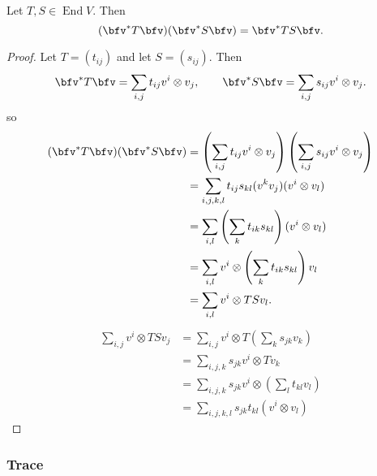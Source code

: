 \documentclass{article}
\DeclareMathOperator{\End}{End}
\begin{document}
\begin{proposition}
    Let $T, S \in \End V$.
    Then
    \[
        (\bfv^\ast T \bfv)(\bfv^\ast S \bfv)
        =
        \bfv^\ast TS \bfv.
    \]
\end{proposition}

\begin{proof}
    Let $T = (t_{ij})$ and let $S = (s_{ij})$.
    Then
    \[
        \bfv^\ast T \bfv
        =
        \sum_{i,j}
        t_{ij}
        v^i \otimes v_j
        ,\qquad
        \bfv^\ast S \bfv
        =
        \sum_{i,j}
        s_{ij}
        v^i \otimes v_j.
    \]
    so
    \begin{align*}
        (\bfv^\ast T \bfv)
        (\bfv^\ast S \bfv)
        &=
        \left(
            \sum_{i,j}
            t_{ij}
            v^i \otimes v_j
        \right)
        \left(
            \sum_{i,j}
            s_{ij}
            v^i \otimes v_j
        \right)
        \\
        &=
        \sum_{i,j,k,l}
        t_{ij}
        s_{kl}
        (v^kv_j)
        (v^i \otimes v_l)
        \\
        &=
        \sum_{i,l}
        \left(
            \sum_k
            t_{ik}
            s_{kl}
        \right)
        (v^i \otimes v_l)
        \\
        &=
        \sum_{i,l}
        v^i
        \otimes
        \left(
            \sum_k
            t_{ik}
            s_{kl}
        \right)
        v_l
        \\
        &=
        \sum_{i,l}
        v^i \otimes TSv_l.
    \end{align*}
    \begin{align*}
        \sum_{i,j}
        v^i \otimes TSv_j
        &=
        \sum_{i,j}
        v^i \otimes T
        \left(
            \sum_k
            s_{jk}
            v_k
        \right)
        \\
        &=
        \sum_{i,j,k}
        s_{jk}
        v^i \otimes Tv_k
        \\
        &=
        \sum_{i,j,k}
        s_{jk}
        v^i \otimes 
        \left(
            \sum_l
            t_{kl}v_l
        \right)
        \\
        &=
        \sum_{i,j,k,l}
        s_{jk}
        t_{kl}
        (v^i \otimes v_l)
    \end{align*}
\end{proof}

\subsubsection{Trace}
\end{document}
